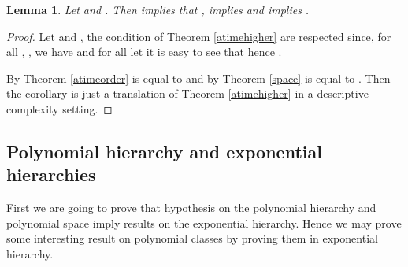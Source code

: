 \documentclass[a4paper,12pt]{article}
\newtheorem{lemma}[theorem]{Lemma}
\theoremstyle{definition}
\begin{document}
\begin{lemma}\label{hocollapse}
  Let  and .  Then  implies
  that ,   implies
   and    implies
  .
\end{lemma}
\begin{proof}
  Let  and ,
  the condition of Theorem \ref{atimehigher} are respected since, for
  all  , ,
  we have  and for all  let
   it is easy to see that  hence
  .

  By Theorem \ref{atimeorder}  is equal to
   and by Theorem \ref{space}
   is equal to . Then the corollary
  is just a translation of Theorem \ref{atimehigher} in a descriptive
  complexity setting.
\end{proof}

\subsection{Polynomial hierarchy and exponential hierarchies}
First we are going to prove that hypothesis on the polynomial
hierarchy and polynomial space imply results on the exponential
hierarchy. Hence we may prove some interesting result on polynomial
classes by proving them in exponential hierarchy.
\end{document}
